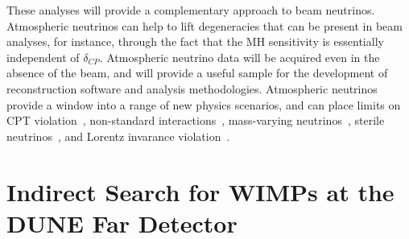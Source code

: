 
These analyses will provide a complementary approach to beam neutrinos.   Atmospheric neutrinos can 
help to lift degeneracies that can be present in beam analyses, for instance, through the fact that the 
MH sensitivity is essentially independent of $\delta_{CP}$.   Atmospheric neutrino data will be acquired 
even in the absence of the beam, and will provide a useful sample for the development of 
reconstruction software and analysis methodologies.  
Atmospheric neutrinos provide a window into a range of new physics scenarios, and can place limits
on CPT violation~\cite{Kostelecky:2003cr}, 
non-standard interactions~\cite{Chatterjee:2014gxa}, mass-varying neutrinos~\cite{Abe:2008zza}, 
sterile neutrinos~\cite{Abe:2014gda}, and
Lorentz invarance violation~\cite{Kostelecky:2011gq}.

\section{Indirect Search for WIMPs at the DUNE Far Detector}

